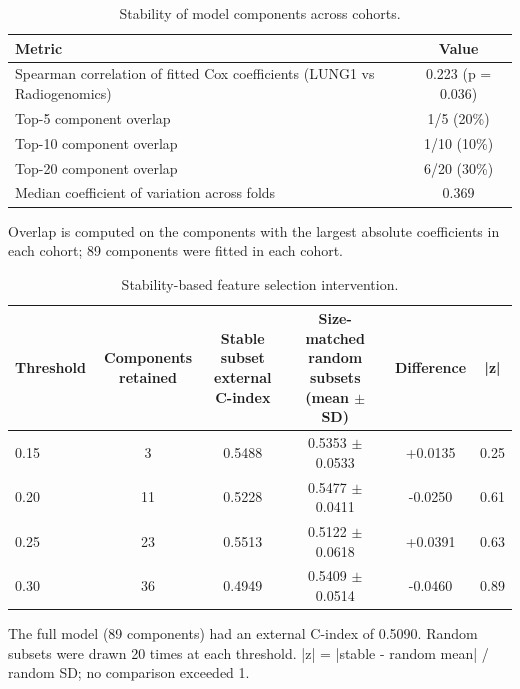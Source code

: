 \documentclass[a4paper,fleqn]{cas-sc}
\begin{document}
\begin{table}[htbp]
\centering
\small
\setlength{\tabcolsep}{4pt}
\caption{Stability of model components across cohorts.}
\label{tbl:5}
\begin{tabular}{@{}lc@{}}
\toprule
Metric & Value \\
\midrule
Spearman correlation of fitted Cox coefficients (LUNG1 vs Radiogenomics) & 0.223 (p = 0.036) \\
Top-5 component overlap & 1/5 (20\%) \\
Top-10 component overlap & 1/10 (10\%) \\
Top-20 component overlap & 6/20 (30\%) \\
Median coefficient of variation across folds & 0.369 \\
\bottomrule
\end{tabular}
\par\medskip\noindent\footnotesize Overlap is computed on the components with the largest absolute coefficients in each cohort; 89 components were fitted in each cohort.
\end{table}

\begin{table}[htbp]
\centering
\small
\setlength{\tabcolsep}{4pt}
\caption{Stability-based feature selection intervention.}
\label{tbl:6}
\begin{tabular}{@{}lccccc@{}}
\toprule
Threshold & Components retained & \shortstack{Stable subset\\external C-index} & \shortstack{Size-matched random\\subsets (mean $\pm$ SD)} & Difference & |z| \\
\midrule
0.15 & 3 & 0.5488 & 0.5353 $\pm$ 0.0533 & +0.0135 & 0.25 \\
0.20 & 11 & 0.5228 & 0.5477 $\pm$ 0.0411 & -0.0250 & 0.61 \\
0.25 & 23 & 0.5513 & 0.5122 $\pm$ 0.0618 & +0.0391 & 0.63 \\
0.30 & 36 & 0.4949 & 0.5409 $\pm$ 0.0514 & -0.0460 & 0.89 \\
\bottomrule
\end{tabular}
\par\medskip\noindent\footnotesize The full model (89 components) had an external C-index of 0.5090. Random subsets were drawn 20 times at each threshold. |z| = |stable - random mean| / random SD; no comparison exceeded 1.
\end{table}
\end{document}
